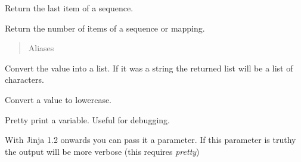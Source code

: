 \documentclass[a4paper,10pt,english]{sphinxmanual}
\begin{document}

\begin{fulllineitems}
\label{templates:last}
Return the last item of a sequence.

\end{fulllineitems}


\begin{fulllineitems}
\label{templates:length}
Return the number of items of a sequence or mapping.
\begin{quote}\begin{description}
\item[{Aliases }] \leavevmode
{}

\end{description}\end{quote}

\end{fulllineitems}


\begin{fulllineitems}
\label{templates:list}
Convert the value into a list.  If it was a string the returned list
will be a list of characters.

\end{fulllineitems}


\begin{fulllineitems}
\label{templates:lower}
Convert a value to lowercase.

\end{fulllineitems}


\begin{fulllineitems}
\label{templates:pprint}
Pretty print a variable. Useful for debugging.

With Jinja 1.2 onwards you can pass it a parameter.  If this parameter
is truthy the output will be more verbose (this requires \emph{pretty})

\end{fulllineitems}
\end{document}
